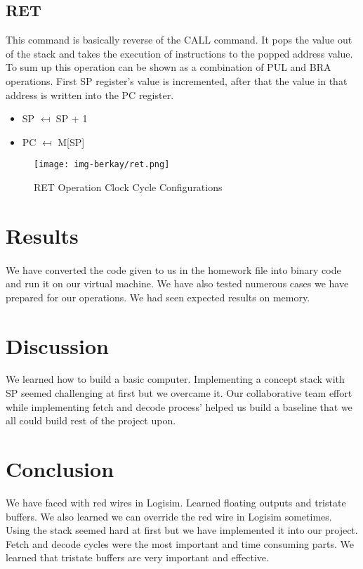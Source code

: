 \documentclass{article}
\begin{document}
\subsection{RET}
This command is basically reverse of the CALL command. It pops the value out of the stack and takes the execution of instructions to the popped address value. To sum up this operation can be shown as a combination of PUL and BRA operations. First SP register's value is incremented, after that the value in that address is written into the PC register.
\begin{itemize}
    \item SP $\mapsfrom$ SP + 1
    \item PC $\mapsfrom$ M[SP]
\end{itemize}
\begin{figure}[h]
    \centering
    \texttt{[image: img-berkay/ret.png]}
    \caption{RET Operation Clock Cycle Configurations}
    \label{fig:my_label}
\end{figure}
\newpage
\section{Results}
\paragraph{}
We have converted the code given to us in the homework file into binary code and run it on our virtual machine. We have also tested numerous cases we have prepared for our operations. We had seen expected results on memory.
\section{Discussion}
We learned how to build a basic computer.  Implementing a concept stack with SP seemed challenging at first but we overcame it. Our collaborative team effort while implementing fetch and decode process' helped us build a baseline that we all could build rest of the project upon.
\section{Conclusion}
We have faced with red wires in Logisim. Learned floating outputs and tristate buffers. We also learned we can override the red wire in Logisim sometimes. Using the stack seemed hard at first but we have implemented it into our project. Fetch and decode cycles were the most important and time consuming parts. We learned that tristate buffers are very important and effective.
\end{document}
